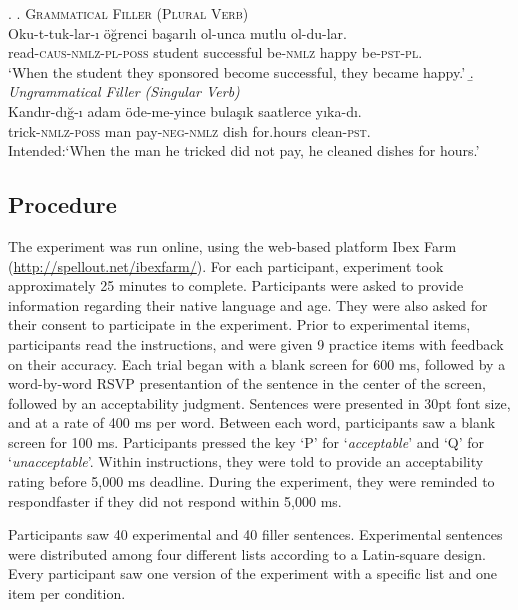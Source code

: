 \documentclass[doc,a4paper,man,natbib,floatsintext,noextraspace]{apa6}\usepackage[]{graphicx}\usepackage[]{color}
\begin{document}
\ex. \label{item:exp2FillerItems}
%
\a. \label{item:exp2FillerItems_plural} \textsc{Grammatical Filler (Plural Verb)}\\ 
  \gll Oku-t-tuk-lar-ı öğrenci başarılı ol-unca mutlu ol-du-lar.\\ 
  read-\textsc{caus}-\textsc{nmlz}-\textsc{pl}-\textsc{poss}  student successful be-\textsc{nmlz} happy be-\textsc{pst}-\textsc{pl}.\\
  \glt `When the student they sponsored become successful, they became happy.' 
%
\b. \label{item:exp2FillerItems_singular} \textit{Ungrammatical Filler (Singular Verb)}\\ 
  \gll *Kandır-dığ-ı adam öde-me-yince bulaşık saatlerce yıka-dı.\\ 
  trick-\textsc{nmlz}-\textsc{poss}  man pay-\textsc{neg}-\textsc{nmlz} dish for.hours clean-\textsc{pst}.\\
  \glt Intended:`When the man he tricked did not pay, he cleaned dishes for hours.'

\subsection{Procedure} \label{sec:exp2:procedure}

The experiment was run online, using the web-based platform Ibex Farm (\url{http://spellout.net/ibexfarm/}). For each participant, experiment took approximately 25 minutes to complete.
Participants were asked to provide information regarding their native language and age. They were also asked for their consent to participate in the experiment.
Prior to experimental items, participants read the instructions, and were given 9 practice items with feedback on their accuracy.
Each trial began with a blank screen for 600 ms, followed by a word-by-word RSVP presentantion of the sentence in the center of the screen, followed by an acceptability judgment. Sentences were presented in 30pt font size, and at a rate of 400 ms per word. Between each word, participants saw a blank screen for 100 ms. Participants pressed the key `P' for `\textit{acceptable}' and `Q' for `\textit{unacceptable}'.
Within instructions, they were told to provide an acceptability rating before 5,000 ms deadline. During the experiment, they were reminded to respondfaster if they did not respond within 5,000 ms.

Participants saw 40 experimental and 40 filler sentences. Experimental sentences were distributed among four different lists according to a Latin-square design. Every participant saw one version of the experiment with a specific list and one item per condition.
\end{document}
